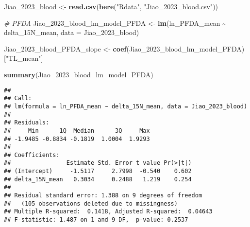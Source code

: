 \documentclass[
]{article}
\newenvironment{Shaded}{\begin{snugshade}}{\end{snugshade}}
\newcommand{\AttributeTok}[1]{\textcolor[rgb]{0.13,0.29,0.53}{#1}}
\newcommand{\CommentTok}[1]{\textcolor[rgb]{0.56,0.35,0.01}{\textit{#1}}}
\newcommand{\FunctionTok}[1]{\textcolor[rgb]{0.13,0.29,0.53}{\textbf{#1}}}
\newcommand{\NormalTok}[1]{#1}
\newcommand{\OtherTok}[1]{\textcolor[rgb]{0.56,0.35,0.01}{#1}}
\newcommand{\SpecialCharTok}[1]{\textcolor[rgb]{0.81,0.36,0.00}{\textbf{#1}}}
\newcommand{\StringTok}[1]{\textcolor[rgb]{0.31,0.60,0.02}{#1}}
\begin{document}
\begin{Shaded}
\begin{Highlighting}[]
\NormalTok{Jiao\_2023\_blood }\OtherTok{\textless{}{-}} \FunctionTok{read.csv}\NormalTok{(}\FunctionTok{here}\NormalTok{(}\StringTok{"Rdata"}\NormalTok{, }\StringTok{"Jiao\_2023\_blood.csv"}\NormalTok{))}

\CommentTok{\# PFDA}
\NormalTok{Jiao\_2023\_blood\_lm\_model\_PFDA }\OtherTok{\textless{}{-}} \FunctionTok{lm}\NormalTok{(ln\_PFDA\_mean }\SpecialCharTok{\textasciitilde{}}\NormalTok{ delta\_15N\_mean,}
                                    \AttributeTok{data =}\NormalTok{ Jiao\_2023\_blood)}

\NormalTok{Jiao\_2023\_blood\_PFDA\_slope }\OtherTok{\textless{}{-}} \FunctionTok{coef}\NormalTok{(Jiao\_2023\_blood\_lm\_model\_PFDA)[}\StringTok{"TL\_mean"}\NormalTok{]}

\FunctionTok{summary}\NormalTok{(Jiao\_2023\_blood\_lm\_model\_PFDA)}
\end{Highlighting}
\end{Shaded}

\begin{verbatim}
## 
## Call:
## lm(formula = ln_PFDA_mean ~ delta_15N_mean, data = Jiao_2023_blood)
## 
## Residuals:
##     Min      1Q  Median      3Q     Max 
## -1.9485 -0.8834 -0.1819  1.0004  1.9293 
## 
## Coefficients:
##                Estimate Std. Error t value Pr(>|t|)
## (Intercept)     -1.5117     2.7998  -0.540    0.602
## delta_15N_mean   0.3034     0.2488   1.219    0.254
## 
## Residual standard error: 1.388 on 9 degrees of freedom
##   (105 observations deleted due to missingness)
## Multiple R-squared:  0.1418, Adjusted R-squared:  0.04643 
## F-statistic: 1.487 on 1 and 9 DF,  p-value: 0.2537
\end{verbatim}
\end{document}
